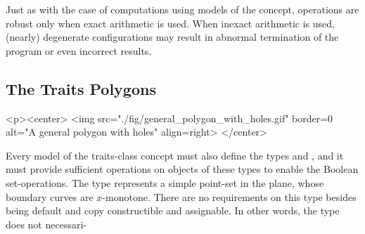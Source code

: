 Just as with the case of computations using models of the 
 concept, operations are robust only
when exact arithmetic is used. When inexact arithmetic is used,
(nearly) degenerate configurations may result in abnormal termination
of the program or even incorrect results.

\subsection{The Traits Polygons}
\label{bso_ssec:traits_polygons}
\lcTex{%
  \setlength{\widthRight}{1.4cm}
  \setlength{\widthLeft}{\widthLineReal}
  \addtolength{\widthLeft}{-\widthRight}
  \begin{minipage}{\widthLeft}
}
\label{fig:general_polygon_with_holes}
\begin{ccHtmlOnly}
  <p><center>
    <img src="./fig/general_polygon_with_holes.gif" border=0 alt="A general polygon with holes" align=right>
  </center>
\end{ccHtmlOnly}
Every model of the traits-class concept must also define the types
 and , and it must provide
sufficient operations on objects of these types to enable the Boolean 
set-operations.  The type  represents a simple point-set 
in the plane, whose boundary curves are $x$-monotone. There are no 
requirements on this type besides being default and copy constructible and
assignable. In other words, the type  does not necessari-
\\
